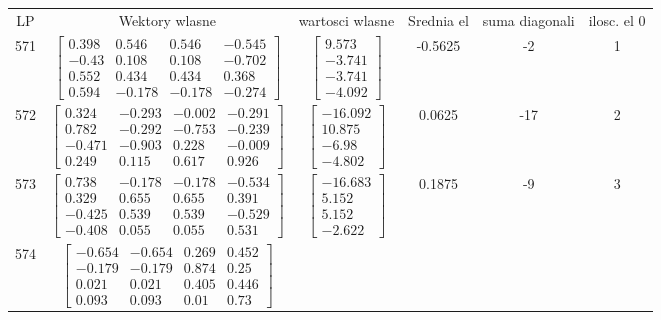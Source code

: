 \documentclass[a4paper,12pt]{article}
\begin{document}
\bgroup {} \vspace{0.2in} \begin{tabular}{c c c c c c}
LP &Wektory wlasne & wartosci wlasne & Srednia el & suma diagonali & ilosc. el 0\\
571
&
$\begin{bmatrix} 0.398 & 0.546 & 0.546 & -0.545 \\ -0.43 & 0.108 & 0.108 & -0.702 \\ 0.552 & 0.434 & 0.434 & 0.368 \\ 0.594 & -0.178 & -0.178 & -0.274 \end{bmatrix}$
&
$\begin{bmatrix} 9.573 \\ -3.741 \\ -3.741 \\ -4.092 \end{bmatrix}$
&
-0.5625
&
-2
&
1
\\
572
&
$\begin{bmatrix} 0.324 & -0.293 & -0.002 & -0.291 \\ 0.782 & -0.292 & -0.753 & -0.239 \\ -0.471 & -0.903 & 0.228 & -0.009 \\ 0.249 & 0.115 & 0.617 & 0.926 \end{bmatrix}$
&
$\begin{bmatrix} -16.092 \\ 10.875 \\ -6.98 \\ -4.802 \end{bmatrix}$
&
0.0625
&
-17
&
2
\\
573
&
$\begin{bmatrix} 0.738 & -0.178 & -0.178 & -0.534 \\ 0.329 & 0.655 & 0.655 & 0.391 \\ -0.425 & 0.539 & 0.539 & -0.529 \\ -0.408 & 0.055 & 0.055 & 0.531 \end{bmatrix}$
&
$\begin{bmatrix} -16.683 \\ 5.152 \\ 5.152 \\ -2.622 \end{bmatrix}$
&
0.1875
&
-9
&
3
\\
574
&
$\begin{bmatrix} -0.654 & -0.654 & 0.269 & 0.452 \\ -0.179 & -0.179 & 0.874 & 0.25 \\ 0.021 & 0.021 & 0.405 & 0.446 \\ 0.093 & 0.093 & 0.01 & 0.73 \end{bmatrix}$

\end{tabular}
\end{document}

